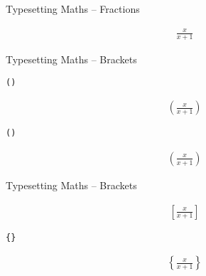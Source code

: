 \documentclass[t]{beamer}
\begin{document}
\begin{frame}{Typesetting Maths -- Fractions}

  \texttt{}

  \begin{align*}
    \frac{x}{x + 1}
  \end{align*}

\end{frame}

\begin{frame}{Typesetting Maths -- Brackets}

  \texttt{()}

  \begin{align*}
    (\frac{x}{x + 1})
  \end{align*}

  \texttt{\left(\right)}

  \begin{align*}
    \left(\frac{x}{x + 1}\right)
  \end{align*}

\end{frame}

\begin{frame}{Typesetting Maths -- Brackets}

  \texttt{}

  \begin{align*}
    \left[\frac{x}{x + 1}\right]
  \end{align*}

  \texttt{\left\{\right\}}

  \begin{align*}
    \left\{\frac{x}{x + 1}\right\}
  \end{align*}

\end{frame}
\end{document}
